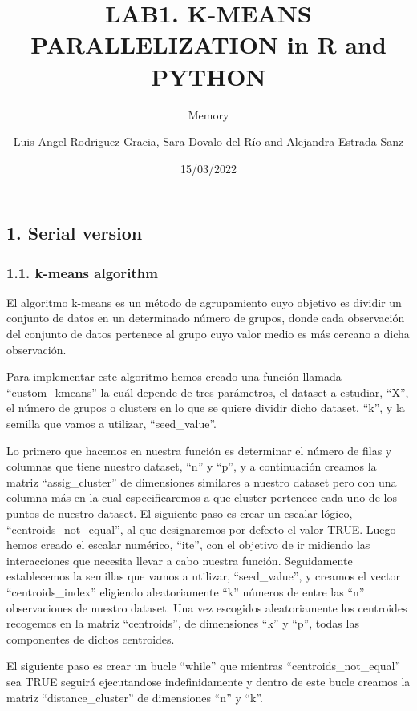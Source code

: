 \documentclass[
]{article}
\title{LAB1. K-MEANS PARALLELIZATION in R and PYTHON}
\subtitle{Memory}
\author{Luis Angel Rodriguez Gracia, Sara Dovalo del Río and Alejandra
Estrada Sanz}
\date{15/03/2022}
\begin{document}
\maketitle

\hypertarget{serial-version}{%
\subsection{1. Serial version}\label{serial-version}}

\hypertarget{k-means-algorithm}{%
\subsubsection{1.1. k-means algorithm}\label{k-means-algorithm}}

El algoritmo k-means es un método de agrupamiento cuyo objetivo es
dividir un conjunto de datos en un determinado número de grupos, donde
cada observación del conjunto de datos pertenece al grupo cuyo valor
medio es más cercano a dicha observación.

Para implementar este algoritmo hemos creado una función llamada
``custom\_kmeans'' la cuál depende de tres parámetros, el dataset a
estudiar, ``X'', el número de grupos o clusters en lo que se quiere
dividir dicho dataset, ``k'', y la semilla que vamos a utilizar,
``seed\_value''.

Lo primero que hacemos en nuestra función es determinar el número de
filas y columnas que tiene nuestro dataset, ``n'' y ``p'', y a
continuación creamos la matriz ``assig\_cluster'' de dimensiones
similares a nuestro dataset pero con una columna más en la cual
especificaremos a que cluster pertenece cada uno de los puntos de
nuestro dataset. El siguiente paso es crear un escalar lógico,
``centroids\_not\_equal'', al que designaremos por defecto el valor
TRUE. Luego hemos creado el escalar numérico, ``ite'', con el objetivo
de ir midiendo las interacciones que necesita llevar a cabo nuestra
función. Seguidamente establecemos la semillas que vamos a utilizar,
``seed\_value'', y creamos el vector ``centroids\_index'' eligiendo
aleatoriamente ``k'' números de entre las ``n'' observaciones de nuestro
dataset. Una vez escogidos aleatoriamente los centroides recogemos en la
matriz ``centroids'', de dimensiones ``k'' y ``p'', todas las
componentes de dichos centroides.

El siguiente paso es crear un bucle ``while'' que mientras
``centroids\_not\_equal'' sea TRUE seguirá ejecutandose indefinidamente
y dentro de este bucle creamos la matriz ``distance\_cluster'' de
dimensiones ``n'' y ``k''.
\end{document}
